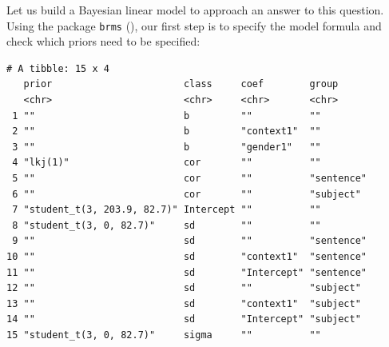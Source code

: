 \documentclass[
  doc,
  floatsintext,
  longtable,
  nolmodern,
  notxfonts,
  notimes,
  colorlinks=true,linkcolor=blue,citecolor=blue,urlcolor=blue]{apa7}
\newenvironment{Shaded}{\begin{snugshade}}{\end{snugshade}}
\newcommand{\CommentTok}[1]{\textcolor[rgb]{0.37,0.37,0.37}{#1}}
\newcommand{\DecValTok}[1]{\textcolor[rgb]{0.68,0.00,0.00}{#1}}
\newcommand{\FloatTok}[1]{\textcolor[rgb]{0.68,0.00,0.00}{#1}}
\newcommand{\FunctionTok}[1]{\textcolor[rgb]{0.28,0.35,0.67}{#1}}
\newcommand{\NormalTok}[1]{\textcolor[rgb]{0.00,0.23,0.31}{#1}}
\newcommand{\OtherTok}[1]{\textcolor[rgb]{0.00,0.23,0.31}{#1}}
\newcommand{\SpecialCharTok}[1]{\textcolor[rgb]{0.37,0.37,0.37}{#1}}
\begin{document}
Let us build a Bayesian linear model to approach an answer to this
question. Using the package \texttt{brms}
(), our first
step is to specify the model formula and check which priors need to be
specified:

\begin{Shaded}
\end{Shaded}

\begin{verbatim}
# A tibble: 15 x 4
   prior                       class     coef        group     
   <chr>                       <chr>     <chr>       <chr>     
 1 ""                          b         ""          ""        
 2 ""                          b         "context1"  ""        
 3 ""                          b         "gender1"   ""        
 4 "lkj(1)"                    cor       ""          ""        
 5 ""                          cor       ""          "sentence"
 6 ""                          cor       ""          "subject" 
 7 "student_t(3, 203.9, 82.7)" Intercept ""          ""        
 8 "student_t(3, 0, 82.7)"     sd        ""          ""        
 9 ""                          sd        ""          "sentence"
10 ""                          sd        "context1"  "sentence"
11 ""                          sd        "Intercept" "sentence"
12 ""                          sd        ""          "subject" 
13 ""                          sd        "context1"  "subject" 
14 ""                          sd        "Intercept" "subject" 
15 "student_t(3, 0, 82.7)"     sigma     ""          ""        
\end{verbatim}
\end{document}
